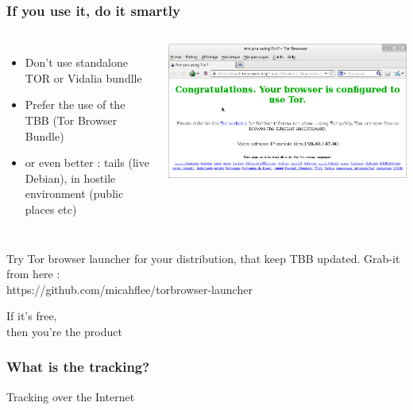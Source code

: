 \begin{frame}
\frametitle{If you use it, do it smartly}
\begin{columns}[c]
\begin{itemize}
\item Don't use standalone TOR or Vidalia bundlle
\item Prefer the use of the TBB (Tor Browser Bundle)
\item or even better : tails (live Debian), in hostile environment
(public places etc)
\end{itemize}
\includegraphics[keepaspectratio,width=\textwidth, height=.8\textheight]{./materials/tbb}
\end{columns}
Try Tor browser launcher for your distribution, that keep TBB updated. Grab-it
from here :\\ https://github.com/micahflee/torbrowser-launcher
\end{frame}
\begin{frame}
\begin{center}
\Huge{If it's free, \\then you're the product}
\end{center}
\end{frame}

\begin{frame}
\frametitle{What is the tracking?}

\begin{block}{Tracking over the Internet}
\begin{itemize}
\end{itemize}
\end{block}
\end{frame}

